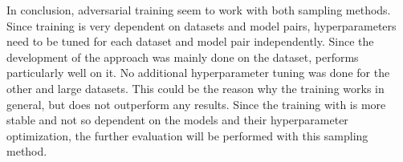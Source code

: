 In conclusion, adversarial training seem to work with both sampling methods.
Since training is very dependent on datasets and model pairs, hyperparameters need to be tuned for each dataset and model pair independently.
Since the development of the approach was mainly done on the \umls dataset, \ussoftmax performs particularly well on it.
No additional hyperparameter tuning was done for the other and large datasets.
This could be the reason why the training works in general, but does not outperform any results.
Since the training with \ussoftmax is more stable and not so dependent on the models and their hyperparameter optimization, the further evaluation will be performed with this sampling method.
\clearpage